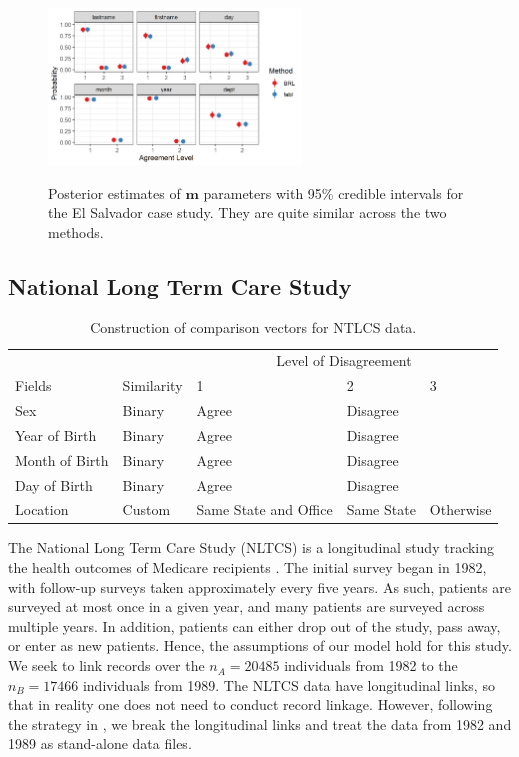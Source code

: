 \documentclass[ba]{imsart}
\begin{document}
	
	\begin{figure}[t]
		\begin{center}
		         \includegraphics[width=0.6\textwidth]{finalFigures/el_salvador/m_posterior_smallP} 
			\caption{Posterior estimates of $\bm{m}$ parameters with 95\% credible intervals for the El Salvador case study. They are quite similar across the two methods.}\label{fig:m-and-u}
			\label{fig:m-and-u}
		\end{center}
	\end{figure}
	
	\subsection{National Long Term Care Study}
	\label{nltcs}
	
	\begin{table}[t]
		\centering
		\begin{tabular}[t]{lllll}
			\multicolumn{2}{c}{ } & \multicolumn{3}{c}{Level of Disagreement} \\
			\cline{3-5}
			Fields & Similarity & 1 & 2 & 3\\
			\hline
			Sex & Binary & Agree & Disagree & \\
			Year of Birth & Binary & Agree & Disagree & \\
			Month of Birth & Binary & Agree & Disagree & \\
			Day of Birth & Binary & Agree & Disagree & \\
			Location & Custom & Same State and Office & Same State & Otherwise \\
			\hline
		\end{tabular}
		\caption{Construction of comparison vectors for NTLCS data.}\label{Tab:nltcs-comparisons}
	\end{table}
	
	The National Long Term Care Study (NLTCS) is a longitudinal study tracking the health outcomes of Medicare recipients \citep{steorts_bayesian_2016}. The initial survey began in 1982, with follow-up surveys taken approximately every five years. As such, patients are surveyed at most once in a given year, and many patients are surveyed across multiple years. In addition, patients can either drop out of the study, pass away, or enter as new patients. Hence, the assumptions of our model hold for this study. We seek to link records over the $n_A = 20485$ individuals from 1982 to the $n_B = 17466$ individuals from 1989. The NLTCS data have longitudinal links, so that in reality one does not need to conduct record linkage. However, following the strategy in \cite{guha:reiter:BA}, we break the longitudinal links and treat the data from 1982 and 1989 as stand-alone data files.
	
\end{document}
